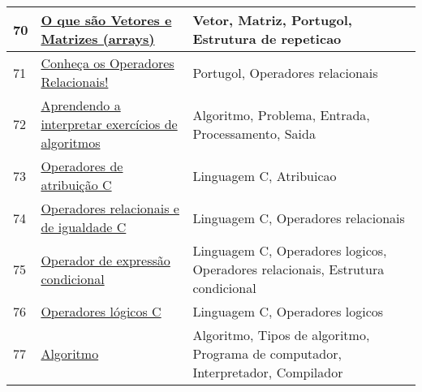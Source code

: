 \begin{longtable}{| p{} | p{} | p{} |}
70  & \href{https://dicasdeprogramacao.com.br/o-que-sao-vetores-e-matrizes-arrays/}{O que são Vetores e Matrizes (arrays)                                               } & Vetor, Matriz, Portugol, Estrutura de repeticao                                                                                                   \\ \hline
71  & \href{https://dicasdeprogramacao.com.br/operadores-relacionais/}{Conheça os Operadores Relacionais!                                                  } & Portugol, Operadores relacionais                                                                                                                  \\ \hline
72  & \href{https://lucianopascal.wordpress.com/2010/04/02/aprendendo-a-interpretar-exercicios-de-algoritmos/}{Aprendendo a interpretar exercícios de algoritmos                                   } & Algoritmo, Problema, Entrada, Processamento, Saida                                                                                                \\ \hline
73  & \href{https://msdn.microsoft.com/pt-br/library/474dd6e2.aspx}{Operadores de atribuição C                                                          } & Linguagem C, Atribuicao                                                                                                                           \\ \hline
74  & \href{https://msdn.microsoft.com/pt-br/library/6swh93dx.aspx}{Operadores relacionais e de igualdade C                                             } & Linguagem C, Operadores relacionais                                                                                                               \\ \hline
75  & \href{https://msdn.microsoft.com/pt-br/library/exefbdtf.aspx}{Operador de expressão condicional                                                   } & Linguagem C, Operadores logicos, Operadores relacionais, Estrutura condicional                                                                    \\ \hline
76  & \href{https://msdn.microsoft.com/pt-br/library/z68fx2f1.aspx}{Operadores lógicos C                                                                } & Linguagem C, Operadores logicos                                                                                                                   \\ \hline
77  & \href{https://pt.wikipedia.org/wiki/Algoritmo}{Algoritmo                                                                           } & Algoritmo, Tipos de algoritmo, Programa de computador, Interpretador, Compilador                                                                  \\ \hline

\end{longtable}
